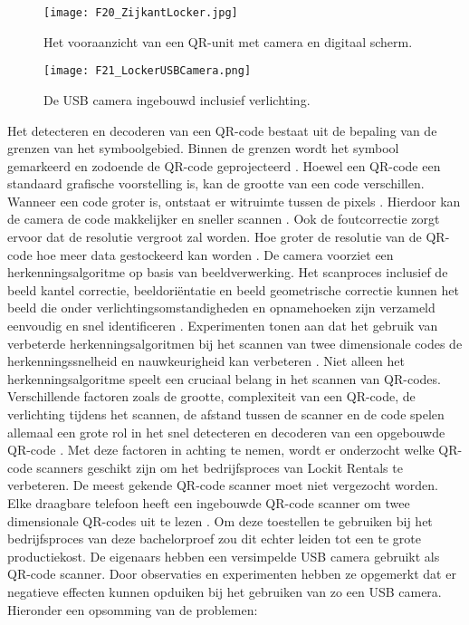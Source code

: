 \begin{figure}[h]
    \centering
    \texttt{[image: F20\_ZijkantLocker.jpg]}
    \captionsetup{justification=centering, singlelinecheck=false}
    \caption{Het vooraanzicht van een QR-unit met camera en digitaal scherm.}
    \label{fig:zijkantLocker}
\end{figure}

\begin{figure}[h]
    \centering
    \texttt{[image: F21\_LockerUSBCamera.png]}
    \captionsetup{justification=centering, singlelinecheck=false}
    \caption{De USB camera ingebouwd inclusief verlichting.}
    \label{fig:usbcameraLocker}
\end{figure}
\newpage
\newline
Het detecteren en decoderen van een QR-code bestaat uit de bepaling van de grenzen van het symboolgebied. Binnen de grenzen wordt het symbool gemarkeerd en zodoende de QR-code geprojecteerd \autocite{Belussi2011}. Hoewel een QR-code een standaard grafische voorstelling is, kan de grootte van een code verschillen. Wanneer een code groter is, ontstaat er witruimte tussen de pixels \autocite{Li2018}. Hierdoor kan de camera de code makkelijker en sneller scannen \autocite{Karrach2020}. Ook de foutcorrectie zorgt ervoor dat de resolutie vergroot zal worden. Hoe groter de resolutie van de QR-code hoe meer data gestockeerd kan worden \autocite{Chow2016}.
\newline
De camera voorziet een herkenningsalgoritme op basis van beeldverwerking. Het scanproces inclusief de beeld kantel correctie, beeldoriëntatie en beeld geometrische correctie kunnen het beeld die onder verlichtingsomstandigheden en opnamehoeken zijn verzameld eenvoudig en snel identificeren \autocite{Gu2011}.
Experimenten tonen aan dat het gebruik van verbeterde herkenningsalgoritmen bij het scannen van twee dimensionale codes de herkenningssnelheid en nauwkeurigheid kan verbeteren \autocite{Gu2011}.
\newline
Niet alleen het herkenningsalgoritme speelt een cruciaal belang in het scannen van QR-codes. Verschillende factoren zoals de grootte, complexiteit van een QR-code, de verlichting tijdens het scannen, de afstand tussen de scanner en de code spelen allemaal een grote rol in het snel detecteren en decoderen van een opgebouwde QR-code \autocite{Liu2008}. Met deze factoren in achting te nemen, wordt er onderzocht welke QR-code scanners geschikt zijn om het bedrijfsproces van Lockit Rentals te verbeteren.
\newline
De meest gekende QR-code scanner moet niet vergezocht worden. Elke draagbare telefoon heeft een ingebouwde QR-code scanner om twee dimensionale QR-codes uit te lezen \autocite{Abdulhakeem2014}. Om deze toestellen te gebruiken bij het bedrijfsproces van deze bachelorproef zou dit echter leiden tot een te grote productiekost. De eigenaars hebben een versimpelde USB camera gebruikt als QR-code scanner. Door observaties en experimenten hebben ze opgemerkt dat er negatieve effecten kunnen opduiken bij het gebruiken van zo een USB camera. Hieronder een opsomming van de problemen:

